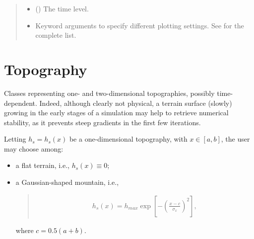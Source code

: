 \documentclass[letterpaper,10pt,english]{sphinxmanual}
\begin{document}
\begin{fulllineitems}
\begin{fulllineitems}
\begin{quote}
\begin{description}
\begin{itemize}
\item {} 
 () \textendash{} The time level.

\item {} 
 \textendash{} Keyword arguments to specify different plotting settings.
See {\hyperref[\detokenize{api:tasmania.utils.utils_plot.streamplot_xz}]{}} for the complete list.

\end{itemize}

\end{description}\end{quote}

\end{fulllineitems}


\end{fulllineitems}



\section{Topography}
\label{\detokenize{api:topography}}\label{\detokenize{api:module-grids.topography}}
Classes representing one- and two-dimensional topographies, possibly time-dependent.
Indeed, although clearly not physical, a terrain surface (slowly) growing in the early stages
of a simulation may help to retrieve numerical stability, as it prevents steep gradients
in the first few iterations.

Letting \(h_s = h_s(x)\) be a one-dimensional topography, with \(x \in [a,b]\),
the user may choose among:
\begin{itemize}
\item {} 
a flat terrain, i.e., \(h_s(x) \equiv 0\);

\item {} 
a Gaussian-shaped mountain, i.e.,
\begin{quote}
\begin{equation*}
\begin{split}h_s(x) = h_{max} \exp{\left[ - \left( \frac{x - c}{\sigma_x} \right)^2 \right]},\end{split}
\end{equation*}\end{quote}

where \(c = 0.5 (a + b)\).

\end{itemize}
\end{document}
